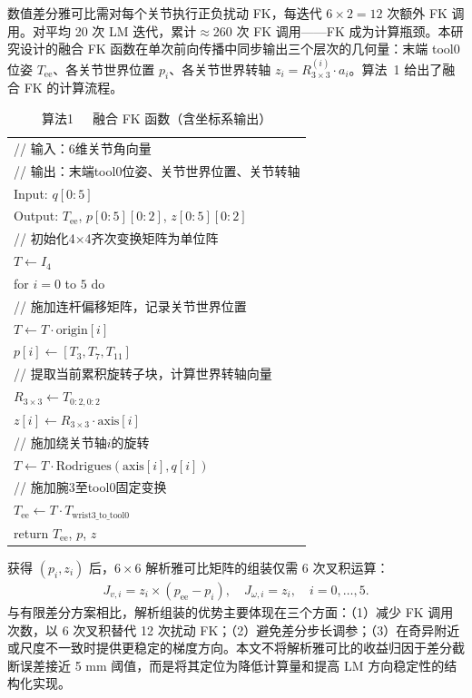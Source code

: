 \documentclass[twocolumn,a4paper,10pt]{ctexart}
\makeatletter
\newenvironment{algotable}[2]{%
  \begin{table}[htbp]
  \centering
  \caption{#2}
  \label{#1}
  \footnotesize\ttfamily
  \begin{tabular}{@{}p{\columnwidth}@{}}
  \toprule
}{%
  \\\bottomrule
  \end{tabular}
  \end{table}
}
\makeatother
\begin{document}
数值差分雅可比需对每个关节执行正负扰动 FK，每迭代 $6\times2=12$ 次额外 FK 调用。对平均 20 次 LM 迭代，累计$\approx$260 次 FK 调用——FK 成为计算瓶颈。本研究设计的融合 FK 函数在单次前向传播中同步输出三个层次的几何量：末端 tool0 位姿 $T_{\mathrm{ee}}$、各关节世界位置 $p_i$、各关节世界转轴 $z_i=R_{3\times3}^{(i)}\cdot a_i$。算法~1 给出了融合 FK 的计算流程。

\begin{algotable}{alg:fk}{算法1~~~融合 FK 函数（含坐标系输出）}
// 输入：6维关节角向量\\
// 输出：末端tool0位姿、关节世界位置、关节转轴\\
Input: $q[0{:}5]$\\
Output: $T_{\mathrm{ee}}$, $p[0{:}5][0{:}2]$, $z[0{:}5][0{:}2]$\\[2pt]
// 初始化4×4齐次变换矩阵为单位阵\\
\quad $T\leftarrow I_4$\\
\quad for $i=0$ to $5$ do\\
// 施加连杆偏移矩阵，记录关节世界位置\\
\qquad $T\leftarrow T\cdot\mathrm{origin}[i]$\\
\qquad $p[i]\leftarrow[T_3,T_7,T_{11}]$\\
// 提取当前累积旋转子块，计算世界转轴向量\\
\qquad $R_{3\times3}\leftarrow T_{0:2,0:2}$\\
\qquad $z[i]\leftarrow R_{3\times3}\cdot\mathrm{axis}[i]$\\
// 施加绕关节轴$i$的旋转\\
\qquad $T\leftarrow T\cdot\mathrm{Rodrigues}(\mathrm{axis}[i],q[i])$\\
// 施加腕3至tool0固定变换\\
\quad $T_{\mathrm{ee}}\leftarrow T\cdot T_{\mathrm{wrist3\_to\_tool0}}$\\
\quad return $T_{\mathrm{ee}}$, $p$, $z$
\end{algotable}

获得 $(p_i,z_i)$ 后，$6\times6$ 解析雅可比矩阵的组装仅需 6 次叉积运算\cite{siciliano2010robotics,buss2004ik}：
\begin{align}
J_{v,i}=z_i\times(p_{\mathrm{ee}}-p_i),\quad J_{\omega,i}=z_i,\quad i=0,\dots,5.
\end{align}
与有限差分方案相比，解析组装的优势主要体现在三个方面：（1）减少 FK 调用次数，以 6 次叉积替代 12 次扰动 FK；（2）避免差分步长调参；（3）在奇异附近或尺度不一致时提供更稳定的梯度方向。本文不将解析雅可比的收益归因于差分截断误差接近 5 mm 阈值，而是将其定位为降低计算量和提高 LM 方向稳定性的结构化实现。
\end{document}

